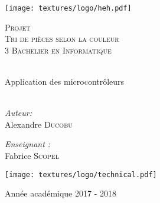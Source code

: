 \begin{center}
  \texttt{[image: textures/logo/heh.pdf]}

  \vspace{1cm}

  \textsc{\LARGE Projet} \\ [0.5cm]
  \textsc{\Large Tri de pièces selon la couleur} \\ [0.5cm]

  \textsc{\large 3 Bachelier en Informatique} \\ [0.2cm]

  \begingroup
   \selectfont 

  \HRule \\ [0.4cm] {
    \huge Application des microcontrôleurs \\ [0.2cm] 
  }
  \HRule \\ [1.3cm]
  \endgroup
  \begin{minipage}[t]{0.4 \textwidth} 
    \begin{flushleft} 
      \large \emph{Auteur:} \\ 
      Alexandre \textsc{Ducobu}
    \end{flushleft} 
  \end{minipage}
  \begin{minipage}[t]{0.4 \textwidth}
    \begin{flushright} 
      \large \emph{Enseignant :} \\
      Fabrice \textsc{Scopel}
    \end{flushright} 
  \end{minipage}

  \vspace{1cm}

  \texttt{[image: textures/logo/technical.pdf]}

  \vspace{0.5cm}

  Année académique 2017 - 2018
\end{center}

\thispagestyle{empty}
